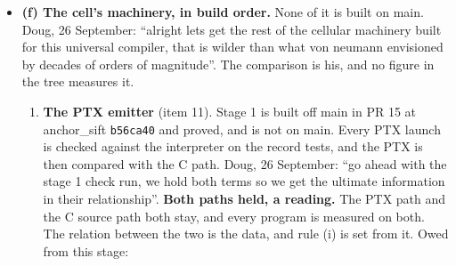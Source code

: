 \begin{enumerate}
\begin{itemize}
\begin{itemize}
\item \textbf{More basic questions, a reading.} When a question kills the process, the next question has to be more basic and asked from a fresh process. The cell that watches the probes, and the limit on what it knows, are posit 12 of 26 September (\texttt{thought\_\allowbreak{}experiments/\allowbreak{}engine/\allowbreak{}posits\_\allowbreak{}26\_\allowbreak{}september.\allowbreak{}md}).
\end{itemize}
\item \textbf{(f) The cell's machinery, in build order.} None of it is built on main. Doug, 26 September: “alright lets get the rest of the cellular machinery built for this universal compiler, that is wilder than what von neumann envisioned by decades of orders of magnitude”. The comparison is his, and no figure in the tree measures it.

\begin{enumerate}
\item \textbf{The PTX emitter} (item 11). Stage 1 is built off main in PR 15 at anchor\_\allowbreak{}sift \texttt{b56ca40} and proved, and is not on main. Every PTX launch is checked against the interpreter on the record tests, and the PTX is then compared with the C path. Doug, 26 September: “go ahead with the stage 1 check run, we hold both terms so we get the ultimate information in their relationship”. \textbf{Both paths held, a reading.} The PTX path and the C source path both stay, and every program is measured on both. The relation between the two is the data, and rule (i) is set from it. Owed from this stage:


\end{enumerate}
\end{itemize}
\end{enumerate}
